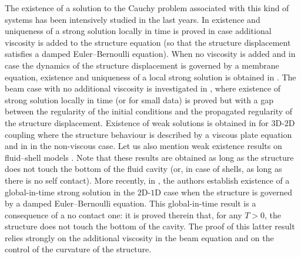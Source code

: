 \documentclass[10pt]{amsart}
\theoremstyle{remark}
\theoremstyle{definition}
\begin{document}
The existence of a solution to the Cauchy problem associated with this kind of systems has been intensively studied in the last years. In \cite{DaVeiga, Lequeurre11, Lequeurre13} existence and uniqueness of a strong solution locally in time is proved in case additional viscosity is added to the structure equation (so that the structure displacement satisfies a damped Euler--Bernoulli equation). When no viscosity is added and in case the dynamics of the structure displacement is governed by a membrane equation, existence and uniqueness of a local strong solution is obtained in \cite{Grandmont-Hillairet-Lequeurre}. The beam case with no additional viscosity is investigated in \cite{Badra-Takahashi}, where existence of strong solution locally in time (or for small data) is proved but with a gap between the regularity of the initial conditions and the propagated regularity of the structure displacement. Existence of weak solutions is obtained in \cite{Chambolle-etal} for $3$D-$2$D coupling where the structure behaviour is described by a viscous plate equation and in \cite{Grandmont08, Muha-Canic13} in the non-viscous case. Let us also mention weak existence results on fluid--shell models \cite{Lengeler, Muha-Schwarzacher}. Note that these results are obtained as long as the structure does not touch the bottom of the fluid cavity (or, in case of shells, as long as there is no self contact). More recently, in \cite{Grandmont-Hillairet}, the authors establish existence of a global-in-time strong solution in the $2$D-$1$D case when the structure is governed by a damped Euler--Bernoulli equation. This global-in-time result is a consequence of a no contact one: it is proved therein that, for any $T>0$, the structure does not touch the bottom of the cavity. The proof of this latter result relies strongly on the additional viscosity in the beam equation and on the control of the curvature of the structure.
\end{document}
